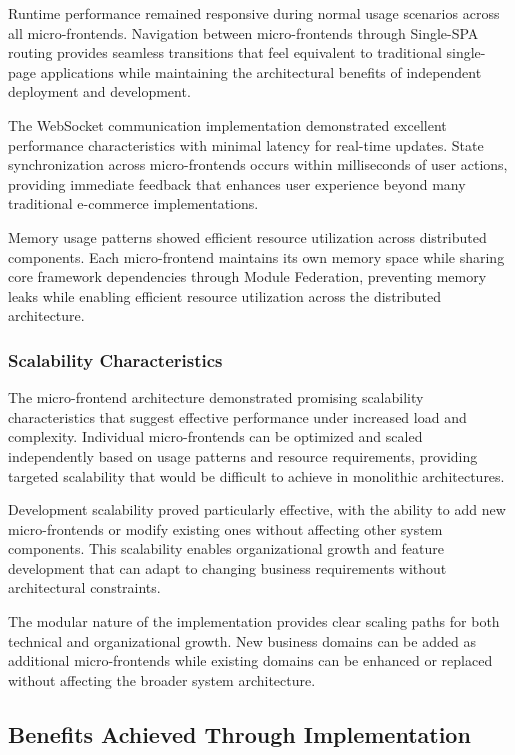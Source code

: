 \documentclass[12pt,a4paper]{report}
\begin{document}
Runtime performance remained responsive during normal usage scenarios across all micro-frontends. Navigation between micro-frontends through Single-SPA routing provides seamless transitions that feel equivalent to traditional single-page applications while maintaining the architectural benefits of independent deployment and development.

The WebSocket communication implementation demonstrated excellent performance characteristics with minimal latency for real-time updates. State synchronization across micro-frontends occurs within milliseconds of user actions, providing immediate feedback that enhances user experience beyond many traditional e-commerce implementations.

Memory usage patterns showed efficient resource utilization across distributed components. Each micro-frontend maintains its own memory space while sharing core framework dependencies through Module Federation, preventing memory leaks while enabling efficient resource utilization across the distributed architecture.

\subsubsection{Scalability Characteristics}

The micro-frontend architecture demonstrated promising scalability characteristics that suggest effective performance under increased load and complexity. Individual micro-frontends can be optimized and scaled independently based on usage patterns and resource requirements, providing targeted scalability that would be difficult to achieve in monolithic architectures.

Development scalability proved particularly effective, with the ability to add new micro-frontends or modify existing ones without affecting other system components. This scalability enables organizational growth and feature development that can adapt to changing business requirements without architectural constraints.

The modular nature of the implementation provides clear scaling paths for both technical and organizational growth. New business domains can be added as additional micro-frontends while existing domains can be enhanced or replaced without affecting the broader system architecture.

\subsection{Benefits Achieved Through Implementation}
\end{document}
